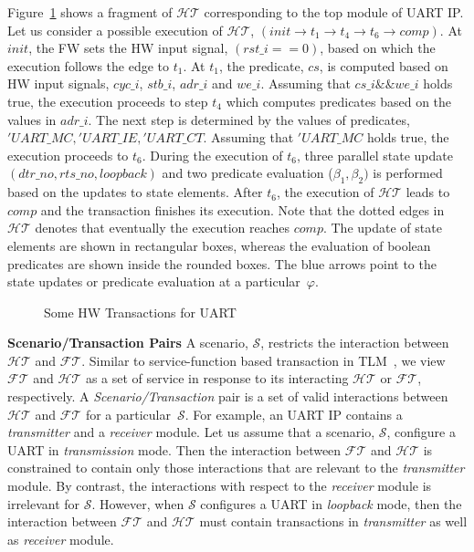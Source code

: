 \documentclass[sigconf]{acmart}
\begin{document}
Figure~\ref{fig:interleaving2} shows a fragment of $\mathcal{HT}$
corresponding to the top module of UART IP.  Let us consider a possible
execution of $\mathcal{HT}$, $(init \rightarrow t_1 \rightarrow t_4
\rightarrow t_6 \rightarrow comp)$.  At $init$, the FW sets the HW input
signal, $(rst\_i==0)$, based on which the execution follows the edge to
$t_1$.  At $t_1$, the predicate, $cs$, is computed based on HW input
signals, $cyc\_i$, $stb\_i$, $adr\_i$ and $we\_i$.  Assuming that $cs\_i
\&\& we\_i$ holds true, the execution proceeds to step $t_4$ which computes
predicates based on the values in $adr\_i$.  The next step is determined by
the values of predicates, $'UART\_MC, 'UART\_IE, 'UART\_CT$.  Assuming that
$'UART\_MC$ holds true, the execution proceeds to $t_6$.  During the
execution of $t_6$, three parallel state update $(dtr\_no, rts\_no,
loopback)$ and two predicate evaluation ($\beta_1,\beta_2)$ is performed
based on the updates to state elements.  After $t_6$, the execution of
$\mathcal{HT}$ leads to $comp$ and the transaction finishes its execution. 
Note that the dotted edges in $\mathcal{HT}$ denotes that eventually the
execution reaches $comp$.  The update of state elements are shown in
rectangular boxes, whereas the evaluation of boolean predicates are shown
inside the rounded boxes.  The blue arrows point to the state updates or
predicate evaluation at a particular~$\varphi$. \\
%
\begin{figure}[t]
\caption{Some HW Transactions for UART
\label{fig:interleaving2}}
\end{figure}
%
\textbf{Scenario/Transaction Pairs}
%
A scenario, $\mathcal{S}$, restricts the interaction between $\mathcal{HT}$
and $\mathcal{FT}$.  Similar to service-function based transaction in
TLM~\cite{hvc}, we view $\mathcal{FT}$ and $\mathcal{HT}$ as a set of
service in response to its interacting $\mathcal{HT}$ or $\mathcal{FT}$,
respectively.  A {\em Scenario/Transaction} pair is a set of valid
interactions between $\mathcal{HT}$ and $\mathcal{FT}$ for a
particular~$\mathcal{S}$.  For example, an UART IP contains a {\em
transmitter} and a {\em receiver} module.  Let us assume that a scenario,
$\mathcal{S}$, configure a UART in {\em transmission} mode.  Then the
interaction between $\mathcal{FT}$ and $\mathcal{HT}$ is constrained to
contain only those interactions that are relevant to the {\em transmitter}
module.  By contrast, the interactions with respect to the {\em receiver}
module is irrelevant for $\mathcal{S}$.  However, when $\mathcal{S}$
configures a UART in {\em loopback} mode, then the interaction between
$\mathcal{FT}$ and $\mathcal{HT}$ must contain transactions in {\em
transmitter} as well as {\em receiver} module.
%
\end{document}
